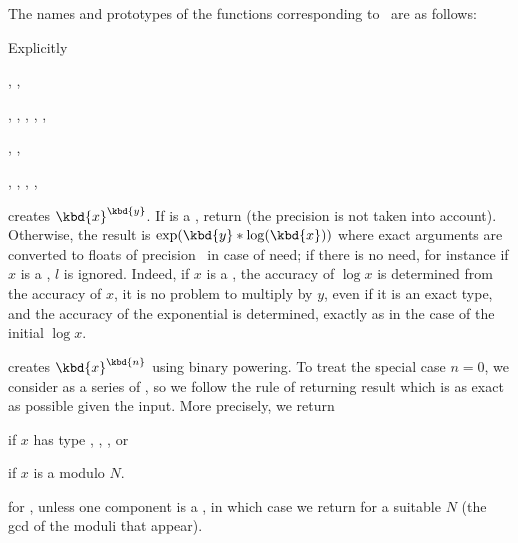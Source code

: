 \noindent The names and prototypes of the functions corresponding
to \op\ are as follows:






\noindent Explicitly

, ,

, ,
, ,
,

, ,

, ,
, ,

 creates $\kbd{x}^{\kbd{y}}$. If
 is a , return  (the precision  is not
taken into account). Otherwise, the result is $\exp(\kbd{y}*\log(\kbd{x}))$
where exact arguments are converted to floats of precision~ in case of
need; if there is no need, for instance if $x$ is a , $l$ is
ignored. Indeed, if $x$ is a , the accuracy of $\log x$ is
determined from the accuracy of $x$, it is no problem to multiply by $y$,
even if it is an exact type, and the accuracy of the exponential is
determined, exactly as in the case of the initial $\log x$.

 creates $\kbd{x}^{\kbd{n}}$ using
binary powering. To treat the special case $n = 0$, we consider
 as a series of , so we follow the rule of returning
result which is as exact as possible given the input. More precisely,
we return

\item {} if $x$ has type , ,  , or

\item {} if $x$ is a  modulo $N$.

\item {} for ,  unless one component
is a , in which case we return  for a suitable
$N$ (the gcd of the moduli that appear).

